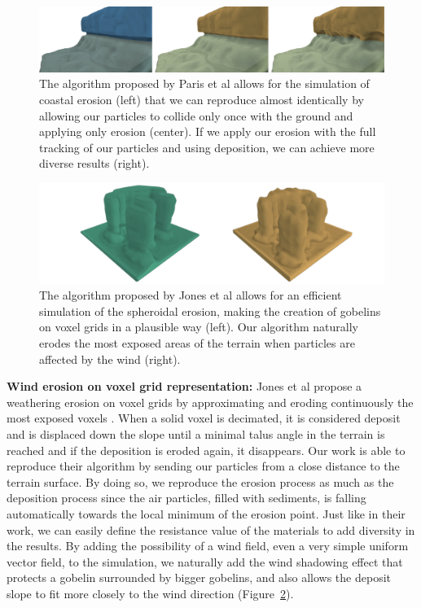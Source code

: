\begin{figure}
\centering
\includegraphics{otherPapersRepro/costal.pdf}
\caption{The algorithm proposed by Paris et al \cite{Paris2019} allows for the simulation of coastal erosion (left) that we can reproduce almost identically by allowing our particles to collide only once with the ground and applying only erosion (center). If we apply our erosion with the full tracking of our particles and using deposition, we can achieve more diverse results (right).}
\label{Erosion-fig:screen-paris2019-1}

\end{figure}
%
\begin{figure}[t]

\centering
\includegraphics[width = \linewidth]{otherPapersRepro/gobelins2.png}
\caption{The algorithm proposed by Jones et al \cite{Jones2010} allows for an efficient simulation of the spheroidal erosion, making the creation of gobelins on voxel grids in a plausible way (left). Our algorithm naturally erodes the most exposed areas of the terrain when particles are affected by the wind (right).}
\label{Erosion-fig:screen-jones2010}
\end{figure}
%
\textbf{Wind erosion on voxel grid representation: }
Jones et al propose a weathering erosion on voxel grids by approximating and eroding continuously the most exposed voxels \cite{Jones2010}. When a solid voxel is decimated, it is considered deposit and is displaced down the slope until a minimal talus angle in the terrain is reached and if the deposition is eroded again, it disappears. Our work is able to reproduce their algorithm by sending our particles from a close distance to the terrain surface. By doing so, we reproduce the erosion process as much as the deposition process since the air particles, filled with sediments, is falling automatically towards the local minimum of the erosion point. Just like in their work, we can easily define the resistance value of the materials to add diversity in the results. By adding the possibility of a wind field, even a very simple uniform vector field, to the simulation, we naturally add the wind shadowing effect that protects a gobelin surrounded by bigger gobelins, and also allows the deposit slope to fit more closely to the wind direction (Figure~\ref{Erosion-fig:screen-jones2010}).

